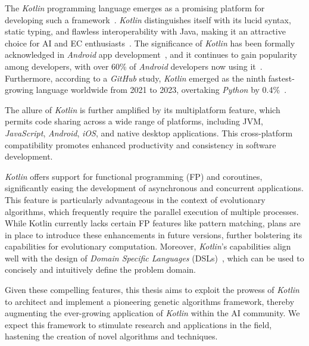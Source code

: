   The \textit{Kotlin} programming language emerges as a promising platform for developing such a 
  framework~\autocite{KotlinProgrammingLanguagea}. \textit{Kotlin} distinguishes itself with its lucid syntax, static 
  typing, and flawless interoperability with Java, making it an attractive choice for AI and EC 
  enthusiasts~\autocite{CallingJavaKotlin,CallingKotlinJava,KotlinJavaInteropGuide}. The significance of 
  \textit{Kotlin} has been formally acknowledged in \textit{Android} app 
  development~\autocite{AndroidKotlinfirstApproach}, and it continues to gain popularity among developers, with over 
  60\% of \textit{Android} developers now using it~\autocite{LatestProgrammingLanguages2023}. Furthermore, according to 
  a \textit{GitHub} study, \textit{Kotlin} emerged as the ninth fastest-growing language worldwide from 2021 to 2023, 
  overtaking \textit{Python} by 0.4\%~\autocite{TopProgrammingLanguages}.

  The allure of \textit{Kotlin} is further amplified by its multiplatform feature, which permits code sharing across a 
  wide range of platforms, including JVM, \textit{JavaScript}, \textit{Android}, \textit{iOS}, and native desktop 
  applications. This cross-platform compatibility promotes enhanced productivity and consistency in software 
  development.

  \textit{Kotlin} offers support for functional programming (FP) and coroutines, significantly easing the development 
  of asynchronous and concurrent applications. This feature is particularly advantageous in the context of evolutionary 
  algorithms, which frequently require the parallel execution of multiple processes. While Kotlin currently lacks 
  certain FP features like pattern matching, plans are in place to introduce these enhancements in future versions, 
  further bolstering its capabilities for evolutionary computation. Moreover, \textit{Kotlin}'s capabilities align well 
  with the design of \textit{Domain Specific Languages} (DSLs)~\autocite{TypesafeBuildersKotlin}, which can be used to 
  concisely and intuitively define the problem domain.

  Given these compelling features, this thesis aims to exploit the prowess of \textit{Kotlin} to architect and 
  implement a pioneering genetic algorithms framework, thereby augmenting the ever-growing application of
  \textit{Kotlin} within the AI community. We expect this framework to stimulate research and applications in the 
  field, hastening the creation of novel algorithms and techniques.
